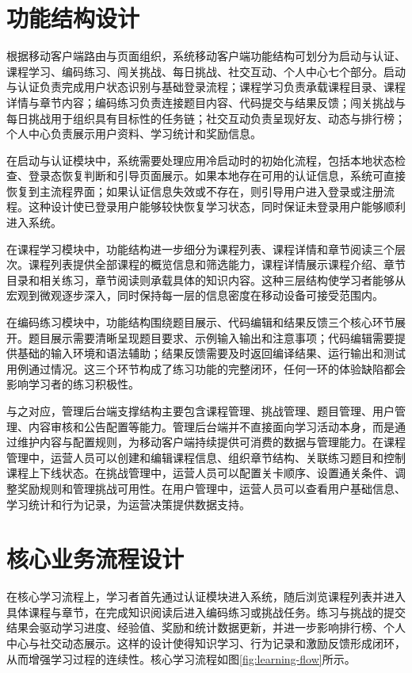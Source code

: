 \section{功能结构设计}

根据移动客户端路由与页面组织，系统移动客户端功能结构可划分为启动与认证、课程学习、编码练习、闯关挑战、每日挑战、社交互动、个人中心七个部分。启动与认证负责完成用户状态识别与基础登录流程；课程学习负责承载课程目录、课程详情与章节内容；编码练习负责连接题目内容、代码提交与结果反馈；闯关挑战与每日挑战用于组织具有目标性的任务链；社交互动负责呈现好友、动态与排行榜；个人中心负责展示用户资料、学习统计和奖励信息。

在启动与认证模块中，系统需要处理应用冷启动时的初始化流程，包括本地状态检查、登录态恢复判断和引导页面展示。如果本地存在可用的认证信息，系统可直接恢复到主流程界面；如果认证信息失效或不存在，则引导用户进入登录或注册流程。这种设计使已登录用户能够较快恢复学习状态，同时保证未登录用户能够顺利进入系统。

在课程学习模块中，功能结构进一步细分为课程列表、课程详情和章节阅读三个层次。课程列表提供全部课程的概览信息和筛选能力，课程详情展示课程介绍、章节目录和相关练习，章节阅读则承载具体的知识内容。这种三层结构使学习者能够从宏观到微观逐步深入，同时保持每一层的信息密度在移动设备可接受范围内。

在编码练习模块中，功能结构围绕题目展示、代码编辑和结果反馈三个核心环节展开。题目展示需要清晰呈现题目要求、示例输入输出和注意事项；代码编辑需要提供基础的输入环境和语法辅助；结果反馈需要及时返回编译结果、运行输出和测试用例通过情况。这三个环节构成了练习功能的完整闭环，任何一环的体验缺陷都会影响学习者的练习积极性。

与之对应，管理后台端支撑结构主要包含课程管理、挑战管理、题目管理、用户管理、内容审核和公告配置等能力。管理后台端并不直接面向学习活动本身，而是通过维护内容与配置规则，为移动客户端持续提供可消费的数据与管理能力。在课程管理中，运营人员可以创建和编辑课程信息、组织章节结构、关联练习题目和控制课程上下线状态。在挑战管理中，运营人员可以配置关卡顺序、设置通关条件、调整奖励规则和管理挑战可用性。在用户管理中，运营人员可以查看用户基础信息、学习统计和行为记录，为运营决策提供数据支持。

\section{核心业务流程设计}

在核心学习流程上，学习者首先通过认证模块进入系统，随后浏览课程列表并进入具体课程与章节，在完成知识阅读后进入编码练习或挑战任务。练习与挑战的提交结果会驱动学习进度、经验值、奖励和统计数据更新，并进一步影响排行榜、个人中心与社交动态展示。这样的设计使得知识学习、行为记录和激励反馈形成闭环，从而增强学习过程的连续性。核心学习流程如图\ref{fig:learning-flow}所示。

